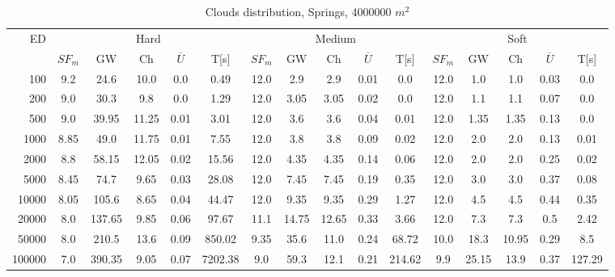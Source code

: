 \begin{table}[htb]
	\centering
	\footnotesize
	\begin{tabular}{|r|c|c|c|c|c|c|c|c|c|c|c|c|c|c|c|} 
		\hline
		\multirow{2}{*}{ED} & \multicolumn{5}{c|}{Hard} & \multicolumn{5}{c|}{Medium} &\multicolumn{5}{c|}{Soft} \\ 
		\cline{2-16} 
		&$SF_{m}$&GW & Ch & $\overline{U}$&T[s] &$SF_{m}$&GW & Ch & $\overline{U}$ &T[s] &$SF_{m}$&GW & Ch & $\overline{U}$  & T[s]  \\ 
		\hline 
		100 & 9.2 & 24.6 & 10.0 & 0.0 & 0.49 & 12.0 & 2.9 & 2.9 & 0.01 & 0.0 & 12.0 & 1.0 & 1.0 & 0.03 & 0.0\\ 
		200 & 9.0 & 30.3 & 9.8 & 0.0 & 1.29 & 12.0 & 3.05 & 3.05 & 0.02 & 0.0 & 12.0 & 1.1 & 1.1 & 0.07 & 0.0\\ 
		500 & 9.0 & 39.95 & 11.25 & 0.01 & 3.01 & 12.0 & 3.6 & 3.6 & 0.04 & 0.01 & 12.0 & 1.35 & 1.35 & 0.13 & 0.0\\ 
		1000 & 8.85 & 49.0 & 11.75 & 0.01 & 7.55 & 12.0 & 3.8 & 3.8 & 0.09 & 0.02 & 12.0 & 2.0 & 2.0 & 0.13 & 0.01\\ 
		2000 & 8.8 & 58.15 & 12.05 & 0.02 & 15.56 & 12.0 & 4.35 & 4.35 & 0.14 & 0.06 & 12.0 & 2.0 & 2.0 & 0.25 & 0.02\\ 
		5000 & 8.45 & 74.7 & 9.65 & 0.03 & 28.08 & 12.0 & 7.45 & 7.45 & 0.19 & 0.35 & 12.0 & 3.0 & 3.0 & 0.37 & 0.08\\ 
		10000 & 8.05 & 105.6 & 8.65 & 0.04 & 44.47 & 12.0 & 9.35 & 9.35 & 0.29 & 1.27 & 12.0 & 4.5 & 4.5 & 0.44 & 0.35\\ 
		20000 & 8.0 & 137.65 & 9.85 & 0.06 & 97.67 & 11.1 & 14.75 & 12.65 & 0.33 & 3.66 & 12.0 & 7.3 & 7.3 & 0.5 & 2.42\\ 
		50000 & 8.0 & 210.5 & 13.6 & 0.09 & 850.02 & 9.35 & 35.6 & 11.0 & 0.24 & 68.72 & 10.0 & 18.3 & 10.95 & 0.29 & 8.5\\ 
		100000 & 7.0 & 390.35 & 9.05 & 0.07 & 7202.38 & 9.0 & 59.3 & 12.1 & 0.21 & 214.62 & 9.9 & 25.15 & 13.9 & 0.37 & 127.29\\ 
		\hline 
	\end{tabular} 
	\caption{Clouds distribution, Springs, 4000000 $m^2$} 
	\label{tab:UnSprings2000} 
\end{table} 
